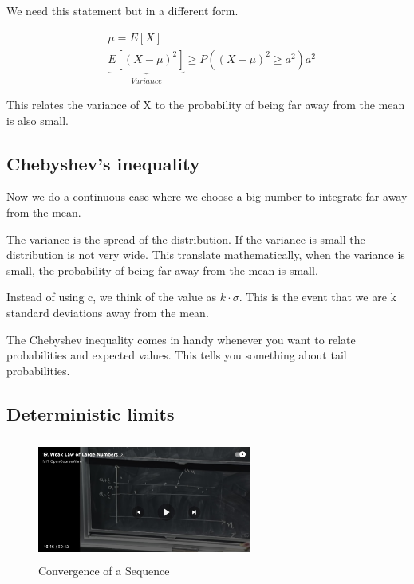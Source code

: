 We need this statement but in a different form.


\begin{align*}
&\mu = E[X]\\
&    \underbrace{E[(X - \mu)^2]}_{Variance} \ge P((X - \mu)^2 \ge a^2) a^2
\end{align*}

 This relates the variance of X to the probability of being far away from the mean is also small.

\subsection{Chebyshev’s inequality}


Now we do a continuous case where we choose a big number to integrate far away from the mean.

 The variance is the spread of the distribution. If the variance is small the distribution is not very wide.  This translate mathematically, when the variance is small, the probability of being far away from the mean is small.

Instead of using c, we think of the value as $k\cdot \sigma$.  This is the event that we are k standard deviations away from the mean.

The Chebyshev inequality comes in handy whenever you want to relate probabilities and expected values.  This tells you something about tail probabilities.


\subsection{Deterministic limits}



\begin{figure}[ht]
\centering
\includegraphics[width=7cm, height=4cm]{images/L19/IMG_3316.jpeg}
\caption{Convergence of a Sequence}
\end{figure}

